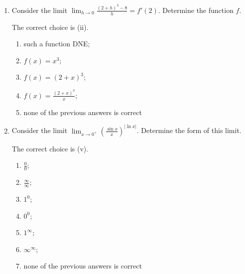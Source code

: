 \documentclass[nooutcomes]{ximera}
\begin{document}
\begin{problem}
\begin{enumerate}
    \item
      Consider the limit $\lim_{h \to 0} \frac{(2+h)^3 - 8}{h} = f'(2)$.
      Determine the function $f$.
      \begin{freeResponse}
        The correct choice is (ii).
      \end{freeResponse}
      \begin{enumerate}
       \item
         such a function DNE;
       \item
         $f(x) = x^3$;
       \item
         $f(x) = (2 + x)^3$;
       \item
         $f(x) = \frac{(2+x)^3}{x}$;
       \item
         none of the previous answers is correct
      \end{enumerate}
      
    \item
      Consider the limit $\lim_{x \to 0^+} \left( \frac{\sin x}{x} \right)^{|\ln x|}$.
      Determine the form of this limit.
      \begin{freeResponse}
        The correct choice is (v).
      \end{freeResponse}
      \begin{enumerate}
       \item
         $\frac{0}{0}$;
       \item
         $\frac{\infty}{\infty}$;
       \item
         $1^0$;
       \item
         $0^0$;
       \item
         $1^\infty$;
       \item
         $\infty^\infty$;
       \item
         none of the previous answers is correct
      \end{enumerate}
  \end{enumerate}
\end{problem}
\end{document}

